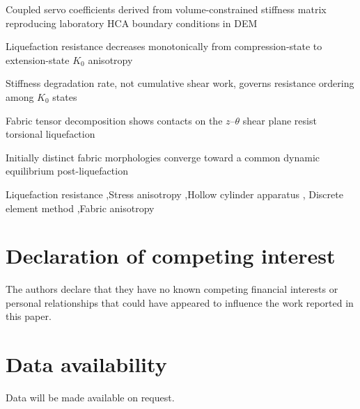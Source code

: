 \documentclass[a4paper,fleqn]{cas-sc}
\newcommand{\Kzero}{\ensuremath{K_0}}
\begin{document}
\begin{highlights}
\item Coupled servo coefficients derived from volume-constrained stiffness matrix reproducing laboratory HCA boundary conditions in DEM
\item Liquefaction resistance decreases monotonically from compression-state to extension-state \Kzero{} anisotropy
\item Stiffness degradation rate, not cumulative shear work, governs resistance ordering among \Kzero{} states
\item Fabric tensor decomposition shows contacts on the $z$--$\theta$ shear plane resist torsional liquefaction
\item Initially distinct fabric morphologies converge toward a common dynamic equilibrium post-liquefaction
\end{highlights}

\begin{keywords}
Liquefaction resistance \sep Stress anisotropy \sep Hollow cylinder apparatus \sep
Discrete element method \sep Fabric anisotropy
\end{keywords}

\maketitle






\section*{Declaration of competing interest}
The authors declare that they have no known competing financial interests or
personal relationships that could have appeared to influence the work reported
in this paper.

\section*{Data availability}
Data will be made available on request.


\printcredits

\appendix






\end{document}
